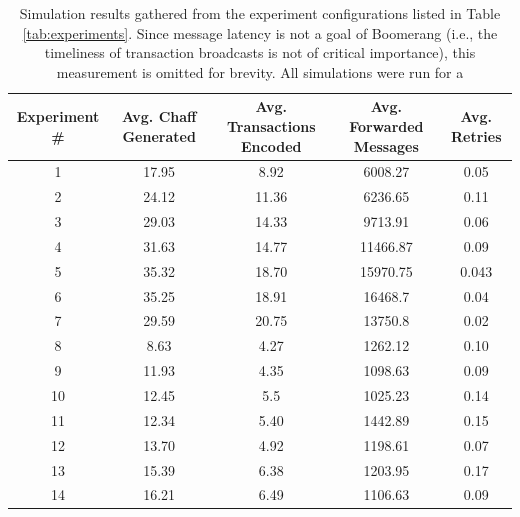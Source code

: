 \begin{table}
\begin{center}
\caption{Simulation results gathered from the experiment configurations listed in Table \ref{tab:experiments}. Since message latency is not a goal of Boomerang (i.e., the timeliness of transaction broadcasts is not of critical importance), this measurement is omitted for brevity. All simulations were run for a }
\label{tab:sim-results}
    \begin{tabular}{|c|c|c|c|c|} \hline
    {\bf Experiment \#} & {\bf Avg. Chaff Generated} & {\bf Avg. Transactions Encoded} & {\bf Avg. Forwarded Messages} & {\bf Avg. Retries} \\ \hline
    1 & 17.95 & 8.92 & 6008.27 & 0.05 \\ 
    2 & 24.12 & 11.36 & 6236.65 & 0.11 \\ 
    3 & 29.03 & 14.33 & 9713.91 & 0.06 \\ 
    4 & 31.63 & 14.77 & 11466.87 & 0.09 \\ 
    5 & 35.32 & 18.70 & 15970.75 & 0.043 \\ 
    6 & 35.25 & 18.91 & 16468.7 & 0.04 \\
    7 & 29.59 & 20.75 & 13750.8 & 0.02 \\ 
    8 & 8.63 & 4.27 & 1262.12 & 0.10 \\ 
    9 & 11.93 & 4.35 & 1098.63 & 0.09 \\ 
    10 & 12.45 & 5.5 & 1025.23 & 0.14 \\ 
    11 & 12.34 & 5.40 & 1442.89 & 0.15 \\ 
    12 & 13.70 & 4.92 & 1198.61 & 0.07 \\ 
    13 & 15.39 & 6.38 & 1203.95 & 0.17 \\ 
    \cellcolor{green!25}14 & \cellcolor{green!25}16.21 & \cellcolor{green!25}6.49 & \cellcolor{green!25}1106.63 & \cellcolor{green!25}0.09 \\ 
    \hline
    \end{tabular}
\end{center}
\end{table}

